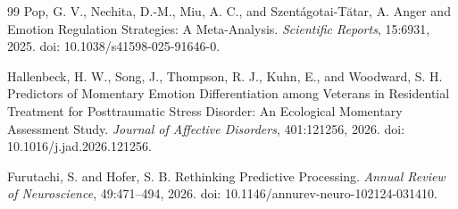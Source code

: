 \documentclass[11pt]{article}
\begin{document}
\begin{thebibliography}{99}
Pop, G. V., Nechita, D.-M., Miu, A. C., and Szent{\'a}gotai-T{\u a}tar, A.
\newblock Anger and Emotion Regulation Strategies: A Meta-Analysis.
\newblock \emph{Scientific Reports}, 15:6931, 2025.
\newblock doi: 10.1038/s41598-025-91646-0.

Hallenbeck, H. W., Song, J., Thompson, R. J., Kuhn, E., and Woodward, S. H.
\newblock Predictors of Momentary Emotion Differentiation among Veterans in Residential Treatment for Posttraumatic Stress Disorder: An Ecological Momentary Assessment Study.
\newblock \emph{Journal of Affective Disorders}, 401:121256, 2026.
\newblock doi: 10.1016/j.jad.2026.121256.

Furutachi, S. and Hofer, S. B.
\newblock Rethinking Predictive Processing.
\newblock \emph{Annual Review of Neuroscience}, 49:471--494, 2026.
\newblock doi: 10.1146/annurev-neuro-102124-031410.

\end{thebibliography}
\end{document}
